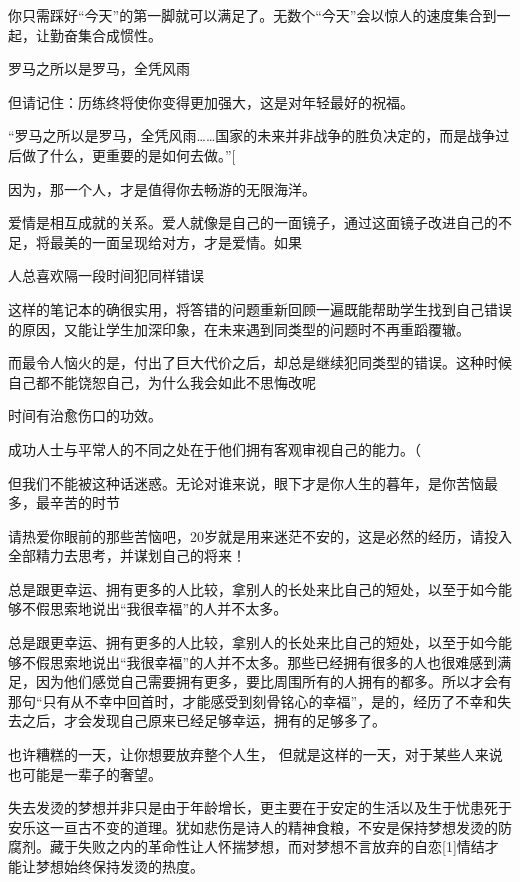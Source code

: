 \documentclass[UTF8,a4paper,8pt]{ctexbook}
\begin{document}
		
		你只需踩好“今天”的第一脚就可以满足了。无数个“今天”会以惊人的速度集合到一起，让勤奋集合成惯性。
		
		
		罗马之所以是罗马，全凭风雨
		
		
		但请记住：历练终将使你变得更加强大，这是对年轻最好的祝福。
		
		
		“罗马之所以是罗马，全凭风雨……国家的未来并非战争的胜负决定的，而是战争过后做了什么，更重要的是如何去做。”[
		
		
		因为，那一个人，才是值得你去畅游的无限海洋。
		
		
		爱情是相互成就的关系。爱人就像是自己的一面镜子，通过这面镜子改进自己的不足，将最美的一面呈现给对方，才是爱情。如果
	
		
		人总喜欢隔一段时间犯同样错误
		
		
		这样的笔记本的确很实用，将答错的问题重新回顾一遍既能帮助学生找到自己错误的原因，又能让学生加深印象，在未来遇到同类型的问题时不再重蹈覆辙。
		
		
		而最令人恼火的是，付出了巨大代价之后，却总是继续犯同类型的错误。这种时候自己都不能饶恕自己，为什么我会如此不思悔改呢
		
		
		时间有治愈伤口的功效。
			
		成功人士与平常人的不同之处在于他们拥有客观审视自己的能力。（
		
		
		但我们不能被这种话迷惑。无论对谁来说，眼下才是你人生的暮年，是你苦恼最多，最辛苦的时节
				
		请热爱你眼前的那些苦恼吧，20岁就是用来迷茫不安的，这是必然的经历，请投入全部精力去思考，并谋划自己的将来！
	
		
		总是跟更幸运、拥有更多的人比较，拿别人的长处来比自己的短处，以至于如今能够不假思索地说出“我很幸福”的人并不太多。
		
		
		总是跟更幸运、拥有更多的人比较，拿别人的长处来比自己的短处，以至于如今能够不假思索地说出“我很幸福”的人并不太多。那些已经拥有很多的人也很难感到满足，因为他们感觉自己需要拥有更多，要比周围所有的人拥有的都多。所以才会有那句“只有从不幸中回首时，才能感受到刻骨铭心的幸福”，是的，经历了不幸和失去之后，才会发现自己原来已经足够幸运，拥有的足够多了。
		
		
		也许糟糕的一天，让你想要放弃整个人生， 但就是这样的一天，对于某些人来说也可能是一辈子的奢望。
		
		
		失去发烫的梦想并非只是由于年龄增长，更主要在于安定的生活以及生于忧患死于安乐这一亘古不变的道理。犹如悲伤是诗人的精神食粮，不安是保持梦想发烫的防腐剂。藏于失败之内的革命性让人怀揣梦想，而对梦想不言放弃的自恋[1]情结才能让梦想始终保持发烫的热度。
		
\end{document}
